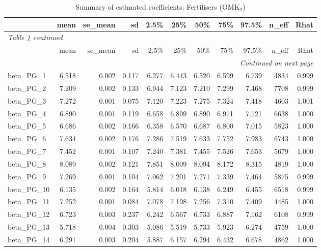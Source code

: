 \documentclass[12pt]{article}
\begin{document}
\begingroup
\footnotesize
\setlength{\tabcolsep}{3pt}
\begin{longtable}{lrrrrrrrrrr}
\caption{Summary of estimated coefficients: Fertilisers (OMK$_\text{2}$)}
\label{tab:coef_summary_omk2} \\
\toprule
 & mean & se\_mean & sd & 2.5\% & 25\% & 50\% & 75\% & 97.5\% & n\_eff & Rhat \\
\midrule
\endfirsthead
\multicolumn{11}{l}{\textit{Table \ref{tab:coef_summary_omk2} continued}} \\
\toprule
 & mean & se\_mean & sd & 2.5\% & 25\% & 50\% & 75\% & 97.5\% & n\_eff & Rhat \\
\midrule
\endhead
\midrule
\multicolumn{11}{r}{\textit{Continued on next page}} \\
\endfoot
\bottomrule
\endlastfoot
beta\_PG\_1  & 6.518 & 0.002 & 0.117 & 6.277 & 6.443 & 6.520 & 6.599 & 6.739 & 4834 & 0.999 \\
beta\_PG\_2  & 7.209 & 0.002 & 0.133 & 6.944 & 7.123 & 7.210 & 7.299 & 7.468 & 7708 & 0.999 \\
beta\_PG\_3  & 7.272 & 0.001 & 0.075 & 7.120 & 7.223 & 7.275 & 7.324 & 7.418 & 4603 & 1.001 \\
beta\_PG\_4  & 6.890 & 0.001 & 0.119 & 6.658 & 6.809 & 6.890 & 6.971 & 7.121 & 6638 & 1.000 \\
beta\_PG\_5  & 6.686 & 0.002 & 0.166 & 6.358 & 6.570 & 6.687 & 6.800 & 7.015 & 5823 & 1.000 \\
beta\_PG\_6  & 7.634 & 0.002 & 0.176 & 7.286 & 7.519 & 7.633 & 7.752 & 7.983 & 6743 & 1.000 \\
beta\_PG\_7  & 7.452 & 0.001 & 0.107 & 7.240 & 7.381 & 7.455 & 7.526 & 7.653 & 5679 & 1.000 \\
beta\_PG\_8  & 8.089 & 0.002 & 0.121 & 7.851 & 8.009 & 8.094 & 8.172 & 8.315 & 4819 & 1.000 \\
beta\_PG\_9  & 7.269 & 0.001 & 0.104 & 7.062 & 7.201 & 7.271 & 7.339 & 7.464 & 5875 & 0.999 \\
beta\_PG\_10 & 6.135 & 0.002 & 0.164 & 5.814 & 6.018 & 6.138 & 6.249 & 6.455 & 6518 & 0.999 \\
beta\_PG\_11 & 7.252 & 0.001 & 0.084 & 7.078 & 7.198 & 7.256 & 7.310 & 7.409 & 4485 & 1.000 \\
beta\_PG\_12 & 6.723 & 0.003 & 0.237 & 6.242 & 6.567 & 6.733 & 6.887 & 7.162 & 6108 & 0.999 \\
beta\_PG\_13 & 5.718 & 0.004 & 0.303 & 5.086 & 5.519 & 5.733 & 5.923 & 6.274 & 4759 & 1.000 \\
beta\_PG\_14 & 6.291 & 0.003 & 0.204 & 5.887 & 6.157 & 6.294 & 6.432 & 6.678 & 4862 & 1.000 \\

\end{longtable}
\end{document}
